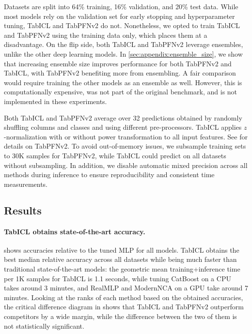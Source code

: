 \documentclass{article}
\theoremstyle{plain}
\theoremstyle{definition}
\theoremstyle{remark}
\begin{document}
Datasets are split into 64\% training, 16\% validation, and 20\% test data. While most models rely on the validation set for early stopping and hyperparameter tuning, TabICL and TabPFNv2 do not. Nonetheless, we opted to train TabICL and TabPFNv2 using the training data only, which places them at a disadvantage.
On the flip side, both TabICL and TabPFNv2 leverage ensembles, unlike the other deep learning models. In \cref{sec:appendix:ensemble_size}, we show that increasing ensemble size improves performance for both TabPFNv2 and TabICL, with TabPFNv2 benefiting more from ensembling.
A fair comparison would require training the other models as an ensemble as well. However, this is computationally expensive, was not part of the original benchmark, and is not implemented in these experiments.

Both TabICL and TabPFNv2 average over 32 predictions obtained by randomly shuffling columns and classes and using different pre-processors. TabICL applies $z$-normalization with or without power transformation to all input features. See \citet{hollmannAccuratePredictionsSmall2025} for details on TabPFNv2. To avoid out-of-memory issues, we subsample training sets to 30K samples for TabPFNv2, while TabICL could predict on all datasets without subsampling. In addition, we disable automatic mixed precision across all methods during inference to ensure reproducibility and consistent time measurements.

\subsection{Results}

\paragraph{TabICL obtains state-of-the-art accuracy.}  shows accuracies relative to the tuned MLP for all models. TabICL obtains the best median relative accuracy across all datasets while being much faster than traditional state-of-the-art models: the geometric mean training+inference time per 1K samples for TabICL is 1.1 seconds, while tuning CatBoost on a CPU takes around 3 minutes, and RealMLP and ModernNCA on a GPU take around 7 minutes. Looking at the ranks of each method based on the obtained accuracies, the critical difference diagram in  shows that TabICL and TabPFNv2 outperform competitors by a wide margin, while the difference between the two of them is not statistically significant.
\end{document}
